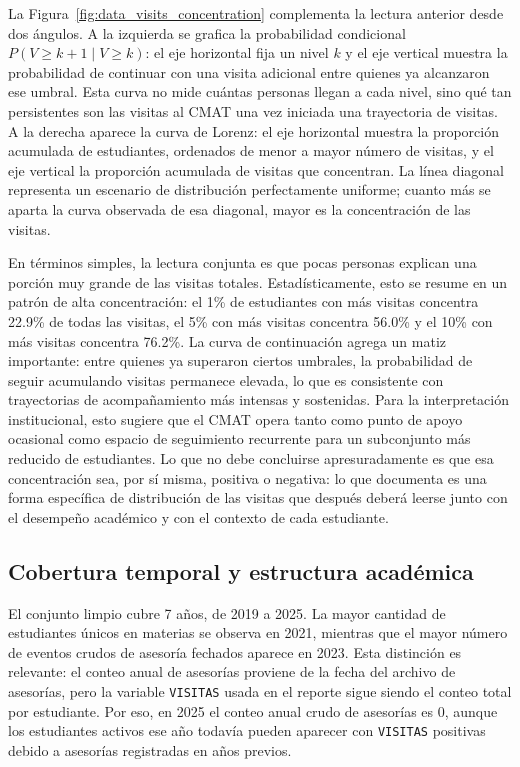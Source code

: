 \documentclass[10pt,letterpaper]{article} %
\numberwithin{figure}{subsection}
\begin{document}
La Figura~\ref{fig:data_visits_concentration} complementa la lectura anterior desde dos ángulos. A la izquierda se grafica la probabilidad condicional $P(V \geq k+1 \mid V \geq k)$: el eje horizontal fija un nivel $k$ y el eje vertical muestra la probabilidad de continuar con una visita adicional entre quienes ya alcanzaron ese umbral. Esta curva no mide cuántas personas llegan a cada nivel, sino qué tan persistentes son las visitas al CMAT una vez iniciada una trayectoria de visitas. A la derecha aparece la curva de Lorenz: el eje horizontal muestra la proporción acumulada de estudiantes, ordenados de menor a mayor número de visitas, y el eje vertical la proporción acumulada de visitas que concentran. La línea diagonal representa un escenario de distribución perfectamente uniforme; cuanto más se aparta la curva observada de esa diagonal, mayor es la concentración de las visitas.

En términos simples, la lectura conjunta es que pocas personas explican una porción muy grande de las visitas totales. Estadísticamente, esto se resume en un patrón de alta concentración: el 1\% de estudiantes con más visitas concentra 22.9\% de todas las visitas, el 5\% con más visitas concentra 56.0\% y el 10\% con más visitas concentra 76.2\%. La curva de continuación agrega un matiz importante: entre quienes ya superaron ciertos umbrales, la probabilidad de seguir acumulando visitas permanece elevada, lo que es consistente con trayectorias de acompañamiento más intensas y sostenidas. Para la interpretación institucional, esto sugiere que el CMAT opera tanto como punto de apoyo ocasional como espacio de seguimiento recurrente para un subconjunto más reducido de estudiantes. Lo que no debe concluirse apresuradamente es que esa concentración sea, por sí misma, positiva o negativa: lo que documenta es una forma específica de distribución de las visitas que después deberá leerse junto con el desempeño académico y con el contexto de cada estudiante.

\begin{table}[!htbp]
    \centering
    \caption{Indicadores de concentración y dispersión estructural de las visitas.}
    \label{tab:data_concentration}
    
\end{table}

\subsection{Cobertura temporal y estructura académica}
El conjunto limpio cubre 7 años, de 2019 a 2025. La mayor cantidad de estudiantes únicos en materias se observa en 2021, mientras que el mayor número de eventos crudos de asesoría fechados aparece en 2023. Esta distinción es relevante: el conteo anual de asesorías proviene de la fecha del archivo de asesorías, pero la variable \texttt{VISITAS} usada en el reporte sigue siendo el conteo total por estudiante. Por eso, en 2025 el conteo anual crudo de asesorías es 0, aunque los estudiantes activos ese año todavía pueden aparecer con \texttt{VISITAS} positivas debido a asesorías registradas en años previos.
\end{document}
